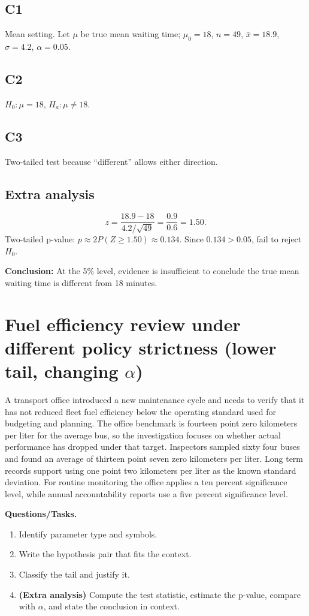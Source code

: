 \subsection*{C1}
Mean setting. Let \(\mu\) be true mean waiting time; \(\mu_0=18\), \(n=49\), \(\bar{x}=18.9\), \(\sigma=4.2\), \(\alpha=0.05\).

\subsection*{C2}
\(H_0:\mu=18\), \(H_a:\mu\ne 18\).

\subsection*{C3}
Two-tailed test because ``different'' allows either direction. \TwoTailGraph

\subsection*{Extra analysis}
\[
z=\frac{18.9-18}{4.2/\sqrt{49}}=\frac{0.9}{0.6}=1.50.
\]
Two-tailed p-value: \(p\approx 2P(Z\ge 1.50)\approx 0.134\). Since \(0.134>0.05\), fail to reject \(H_0\).

\textbf{Conclusion:} At the 5\% level, evidence is insufficient to conclude the true mean waiting time is different from 18 minutes.


\section{Fuel efficiency review under different policy strictness (lower tail, changing \(\alpha\))}
A transport office introduced a new maintenance cycle and needs to verify that it has not reduced fleet fuel efficiency below the operating standard used for budgeting and planning. The office benchmark is fourteen point zero kilometers per liter for the average bus, so the investigation focuses on whether actual performance has dropped under that target. Inspectors sampled sixty four buses and found an average of thirteen point seven zero kilometers per liter. Long term records support using one point two kilometers per liter as the known standard deviation. For routine monitoring the office applies a ten percent significance level, while annual accountability reports use a five percent significance level.

\textbf{Questions/Tasks.}
\begin{enumerate}
    \item[(C1)] Identify parameter type and symbols.
    \item[(C2)] Write the hypothesis pair that fits the context.
    \item[(C3)] Classify the tail and justify it.
    \item[(EA)] \textbf{(Extra analysis)} Compute the test statistic, estimate the p-value, compare with \(\alpha\), and state the conclusion in context.
\end{enumerate}

